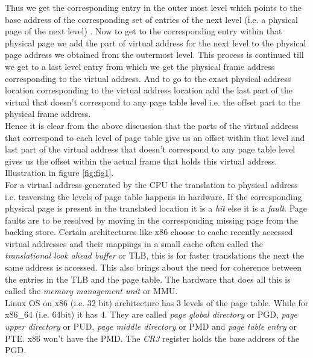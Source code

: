 Thus we get the corresponding entry in the outer most level which points to the base address of
the corresponding set of entries of the next level (i.e. a physical page of the next level) . Now
to get to the corresponding entry within that physical page we add the part of virtual address for
the next level to the physical page address we obtained from the outermost level. This process is
continued till we get to a last level entry from which we get the physical frame address 
corresponding to the virtual address. And to go to the exact physical address location
corresponding to the virtual address location add the last part of the virtual that doesn't
correspond to any page table level i.e. the offset part to the physical frame address.\\    
Hence it is clear from the above discussion that the parts of the virtual address that correspond
to each level of page table give us an offset within that level and last part of the virtual
address that doesn't correspond to any page table level gives us the offset within the actual
frame that holds this virtual address. Illustration in figure \ref{fig:fig1}.\\
For a virtual address generated by the CPU the translation to physical address i.e. traversing the
levels of page table happens in hardware. If the corresponding physical page is present in the
translated location it is a \textit{hit} else it is a \textit{fault}. Page faults are to be
resolved by moving in the corresponding missing page from the backing store. Certain architectures
like x86 choose to cache recently accessed virtual addresses and their mappings in a small cache
often called the \textit{translational look ahead buffer} or TLB, this is for faster translations
the next the same address is accessed. This also brings about the need for coherence between the
entries in the TLB and the page table. The hardware that does all this is called the
\textit{memory management unit} or MMU.\\
Linux OS on x86 (i.e. 32 bit) architecture has 3 levels of the page table. While for x86\_64 (i.e.
64bit) it has 4. They are called \textit{page global directory} or PGD, \textit{page upper
directory} or PUD, \textit{page middle directory} or PMD and \textit{page table entry} or PTE. x86
won't have the PMD. The \textit{CR3} register holds the base address of the PGD.\\

